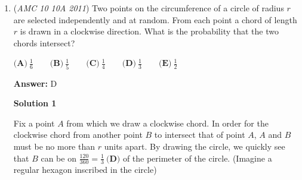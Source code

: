\begin{enumerate}
 Note that this approach might take more testing if one is not familiar with finding factors.

 



\textbf{Solution 3 (Answer choices)}

Since all the answer choices are around $50\%$, we know the town's starting population must be around $600$. We list perfect squares from $400$ to $1000$.
 \[441, 484, 529,576,625,676,729,784,841,900,961\]We see that $484$ and $784$ differ by $300$, and we can confirm that $484$ is the correct starting number by noting that $484+150=634=25^2+9$. Thus, the answer is $300/484\approx \boxed{\textbf{(E) } 62\%}$.

 
(minor edit by mrmatthewzhang)

 



\textbf{Solution 4}

Let the population of the town in 1991 be $a^2$ and the population in 2011 be $b^2$. We know that $a^2+150+150=b^2 \implies a^2-b^2=-300 \implies b^2-a^2=300 \implies (b-a)(b+a)=300$. Note that $b-a$ must be even. Testing, we see that $a=22$ and $b=28$ works, as $484+150-9=625=25^2$, so $\frac{784-484}{484} \approx \boxed{\textbf{(E) } 62\%}$.

 


	\item (\textit{AMC 10 10A 2011}) Two points on the circumference of a circle of radius $r$ are selected independently and at random. From each point a chord of length $r$ is drawn in a clockwise direction. What is the probability that the two chords intersect?


 $\textbf{(A)}\ \frac{1}{6}\qquad\textbf{(B)}\ \frac{1}{5}\qquad\textbf{(C)}\ \frac{1}{4}\qquad\textbf{(D)}\ \frac{1}{3}\qquad\textbf{(E)}\ \frac{1}{2}$

 \textbf{Answer: }D



\textbf{Solution 1}

Fix a point $A$ from which we draw a clockwise chord. In order for the clockwise chord from another point $B$ to intersect that of point $A$, $A$ and $B$ must be no more than $r$ units apart. By drawing the circle, we quickly see that $B$ can be on $\frac{120}{360}=\boxed{\frac{1}{3}  \ \textbf{(D)}}$ of the perimeter of the circle. (Imagine a regular hexagon inscribed in the circle)

 




\end{enumerate}
